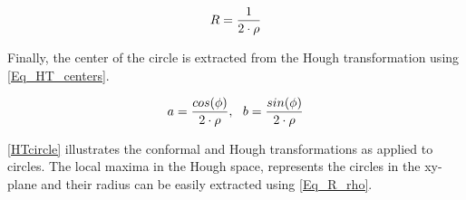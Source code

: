 \begin{equation}
	R = {1 \over {2 \cdot \rho}}
	\label{Eq_R_rho}
\end{equation}

Finally, the center of the circle is extracted from the Hough transformation using \cref{Eq_HT_centers}.


\begin{equation}
	a = {cos(\phi) \over {2 \cdot \rho}},
\,\,\,\,
	b = {sin(\phi) \over {2 \cdot \rho}}
\label{Eq_HT_centers}
\end{equation}

\cref{HTcircle} illustrates the conformal and Hough transformations as applied to circles. The local maxima in the Hough space, represents the circles in the xy-plane and their radius can be easily extracted using \cref{Eq_R_rho}.


